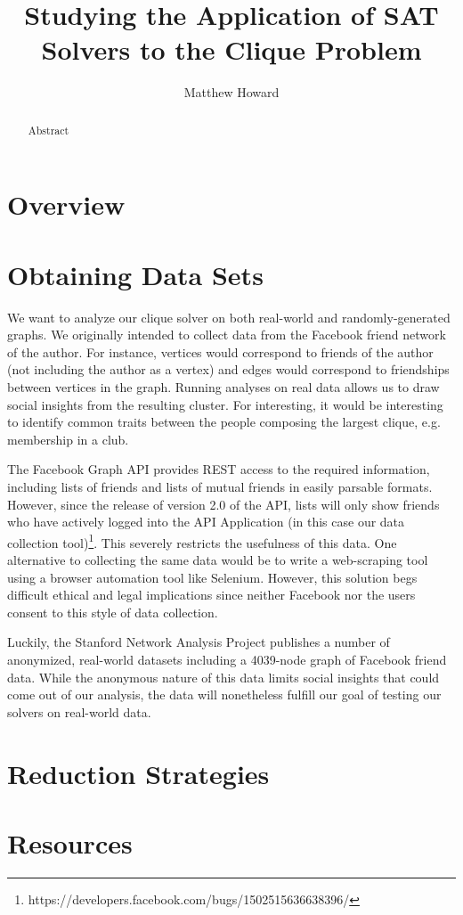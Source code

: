 \documentclass[]{article}
\title{Studying the Application of SAT Solvers to the Clique Problem}
\author{Matthew Howard}
\begin{document}
	
	\maketitle
	
	\begin{abstract}
		Abstract
	\end{abstract}
	
	\section{Overview}
	
	\section{Obtaining Data Sets}
	We want to analyze our clique solver on both real-world and randomly-generated graphs. We originally intended to collect data from the Facebook friend network of the author. For instance, vertices would correspond to friends of the author (not including the author as a vertex) and edges would correspond to friendships between vertices in the graph. Running analyses on real data allows us to draw social insights from the resulting cluster. For interesting, it would be interesting to identify common traits between the people composing the largest clique, e.g. membership in a club.
	
	The Facebook Graph API provides REST access to the required information, including lists of friends and lists of mutual friends in easily parsable formats. However, since the release of version 2.0 of the API, lists will only show friends who have actively logged into the API Application (in this case our data collection tool)\footnote{https://developers.facebook.com/bugs/1502515636638396/}. This severely restricts the usefulness of this data. One alternative to collecting the same data would be to write a web-scraping tool using a browser automation tool like Selenium. However, this solution begs difficult ethical and legal implications since neither Facebook nor the users consent to this style of data collection.
	
	Luckily, the Stanford Network Analysis Project publishes a number of anonymized, real-world datasets including a 4039-node graph of Facebook friend data. While the anonymous nature of this data limits social insights that could come out of our analysis, the data will nonetheless fulfill our goal of testing our solvers on real-world data.
	
	\section{Reduction Strategies}
	
	\section{Resources}
	
\end{document}
